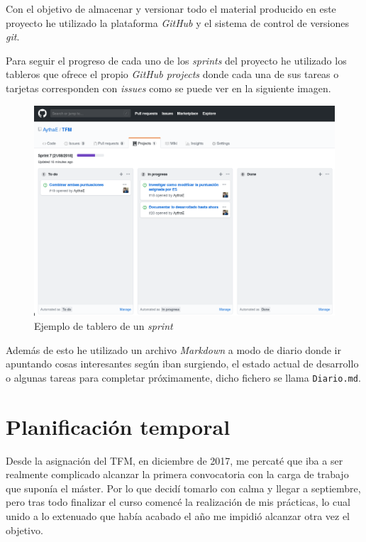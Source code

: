 Con el objetivo de almacenar y versionar todo el material producido en este proyecto he utilizado la plataforma \textit{GitHub} y el sistema de control de versiones \textit{git}.

Para seguir el progreso de cada uno de los \textit{sprints} del proyecto he utilizado los tableros que ofrece el propio \textit{GitHub projects} donde cada una de sus tareas o tarjetas corresponden con \textit{issues} como se puede ver en la siguiente imagen. 

\begin{figure}[h]
	
	\centering
	\includegraphics[width=\linewidth]{imagenes/ejemplo_tablero_sprint}
	\caption{Ejemplo de tablero de un \textit{sprint}}
	\label{fig:tableroSprint}
\end{figure}

Además de esto he utilizado un archivo \textit{Markdown} a modo de diario donde ir apuntando cosas interesantes según iban surgiendo, el estado actual de desarrollo o algunas tareas para completar próximamente, dicho fichero se llama \texttt{Diario.md}.

\section{Planificación temporal}

Desde la asignación del \acrshort{TFM}, en diciembre de 2017, me percaté que iba a ser realmente complicado alcanzar la primera convocatoria con la carga de trabajo que suponía el máster. Por lo que decidí tomarlo con calma y llegar a septiembre, pero tras todo finalizar el curso comencé la realización de mis prácticas, lo cual unido a lo extenuado que había acabado el año me impidió alcanzar otra vez el objetivo. 

